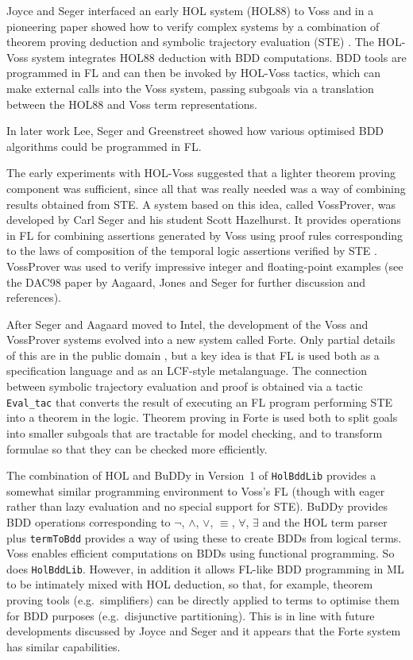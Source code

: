 \documentclass[12pt]{article}
\newcommand{\ml}[1]{{\tt #1}}
\newcommand\HOL{HOL\xspace}
\newcommand{\Buddy}{BuDDy\xspace}
\begin{document}
Joyce and Seger interfaced an early HOL system (HOL88) to Voss and in
a pioneering paper showed how to verify complex systems by a
combination of theorem proving deduction and symbolic trajectory
evaluation (STE) \cite{JoyceSeger}. The HOL-Voss system integrates HOL88
deduction with BDD computations.  BDD tools are programmed in FL and
can then be invoked by HOL-Voss tactics, which can make external
calls into the Voss system, passing subgoals via a translation between
the HOL88 and Voss term representations.

In later work Lee, Seger and Greenstreet \cite{LeeGreenstreetSeger}
showed how various optimised BDD algorithms could be programmed in FL.

The early experiments with HOL-Voss suggested that a lighter theorem
proving component was sufficient, since all that was really needed was
a way of combining results obtained from STE. A system based on this
idea, called VossProver, was developed by Carl Seger and his student
Scott Hazelhurst. It provides operations in FL for combining
assertions generated by Voss using proof rules corresponding to the
laws of composition of the temporal logic assertions verified by STE
\cite{hazelhurst-kropfbook-97}.  
VossProver was used to verify
impressive integer and floating-point examples (see the DAC98
paper by Aagaard, Jones and Seger \cite{aagaard-dac-98} for further
discussion and references). 

After Seger and Aagaard moved to Intel, the development of the Voss and
VossProver systems evolved into a new system called Forte.  Only partial details
of this are in the public domain
\cite{oleary-itj-99,aagaard-tphols-99}, but a key idea is that FL is
used both as a specification language and as an LCF-style
metalanguage. The connection between symbolic trajectory evaluation
and proof is obtained via a tactic {\tt{Eval\_tac}} that converts the
result of executing an FL program performing STE into a theorem in the
logic. Theorem proving in Forte is used both to split goals into
smaller subgoals that are tractable for model checking, and to
transform formulae so that they can be checked more efficiently.

The combination of \HOL{} and \Buddy{} in Version~1 of
{\tt{HolBddLib}} provides a somewhat similar programming environment
to Voss's FL (though with eager rather than lazy evaluation and no
special support for STE). \Buddy{} provides BDD operations
corresponding to $\neg$, $\wedge$, $\vee$, $\equiv$, $\forall$,
$\exists$ and the \HOL{} term parser plus \ml{termToBdd} provides a
way of using these to create BDDs from logical terms.  Voss enables
efficient computations on BDDs using functional programming. So does
\ml{HolBddLib}. However, in addition it allows FL-like BDD programming
in ML to be intimately mixed with \HOL{} deduction, so that, for
example, theorem proving tools (e.g.~simplifiers) can be directly
applied to terms to optimise them for BDD purposes (e.g.~disjunctive
partitioning).  This is in line with future developments discussed by
Joyce and Seger \cite{JoyceSeger} and it appears that the Forte system
has similar capabilities.
\end{document}
